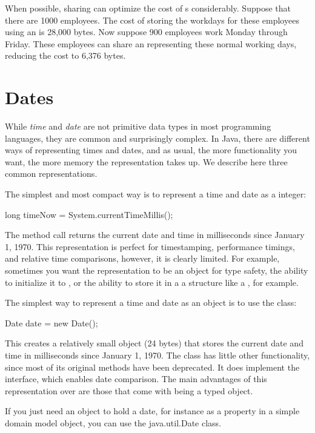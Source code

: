 When possible, sharing can optimize the cost of 
 s considerably. Suppose
that there are 1000 employees. The cost of storing the workdays for these
employees using an  is 28,000 bytes. 
Now suppose 900 employees work Monday
through Friday. These employees can share an  representing
these normal working days, reducing the cost to 6,376 bytes.


\section{Dates}

While \textit{time} and \textit{date} are not primitive data types in most
programming languages, they are common and surprisingly complex. 
In Java, there are different ways of representing times and dates, and as
usual, the more functionality you want, the more memory the representation takes
up. We describe here three common representations.

The simplest and most compact way is to represent a time and date as a
 integer:
\begin{shortlisting}
    long timeNow = System.currentTimeMillis();
\end{shortlisting}
The method call  returns the current 
date and time in milliseconds since January 1, 1970.  This representation is
perfect for timestamping, performance timings, and relative time
comparisons, however, it is clearly limited. For example, sometimes you want the
representation to be an object for type safety, the ability to initialize it
to , or the ability to store it in a a structure like a
, for example.

The simplest way to represent a time and date as an object is to use the
 class:
\begin{shortlisting}
    Date date = new Date();
\end{shortlisting}
This creates a relatively small object (24 bytes) that stores the current date
and time in milliseconds since January 1, 1970. The class  has
little other functionality, since most of its original methods have been
deprecated. It does implement the  interface, which enables
date comparison. The main advantages of this representation over  are
those that come with being a typed object.



If you just need an object to hold a date, for instance as a property in a
simple domain model object, you can use the java.util.Date class.

